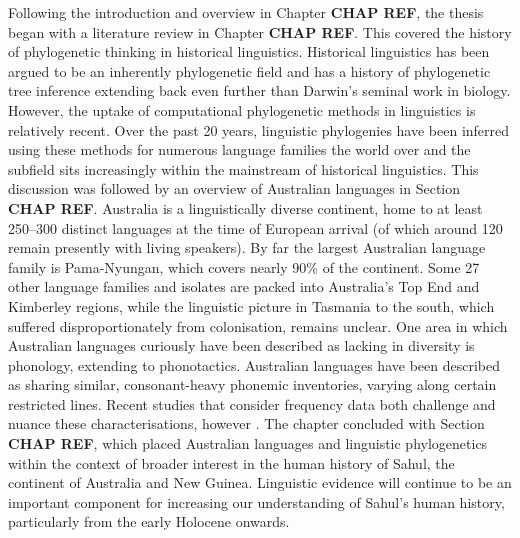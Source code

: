Following the introduction and overview in Chapter \textbf{CHAP REF}, the thesis began with a literature review in Chapter \textbf{CHAP REF}. This covered the history of phylogenetic thinking in historical linguistics. Historical linguistics has been argued to be an inherently phylogenetic field \autocite{dunn_language_2015} and has a history of phylogenetic tree inference extending back even further than Darwin's seminal work in biology. However, the uptake of computational phylogenetic methods in linguistics is relatively recent. Over the past 20 years, linguistic phylogenies have been inferred using these methods for numerous language families the world over and the subfield sits increasingly within the mainstream of historical linguistics. This discussion was followed by an overview of Australian languages in Section \textbf{CHAP REF}. Australia is a linguistically diverse continent, home to at least 250--300 distinct languages at the time of European arrival (of which around 120 remain presently with living speakers). By far the largest Australian language family is Pama-Nyungan, which covers nearly 90\% of the continent. Some 27 other language families and isolates are packed into Australia's Top End and Kimberley regions, while the linguistic picture in Tasmania to the south, which suffered disproportionately from colonisation, remains unclear. One area in which Australian languages curiously have been described as lacking in diversity is phonology, extending to phonotactics. Australian languages have been described as sharing similar, consonant-heavy phonemic inventories, varying along certain restricted lines. Recent studies that consider frequency data both challenge and nuance these characterisations, however \autocites{gasser_revisiting_2014}{round_phonology_2021}{round_phonotactics_2021}. The chapter concluded with Section \textbf{CHAP REF}, which placed Australian languages and linguistic phylogenetics within the context of broader interest in the human history of Sahul, the continent of Australia and New Guinea. Linguistic evidence will continue to be an important component for increasing our understanding of Sahul's human history, particularly from the early Holocene onwards.


